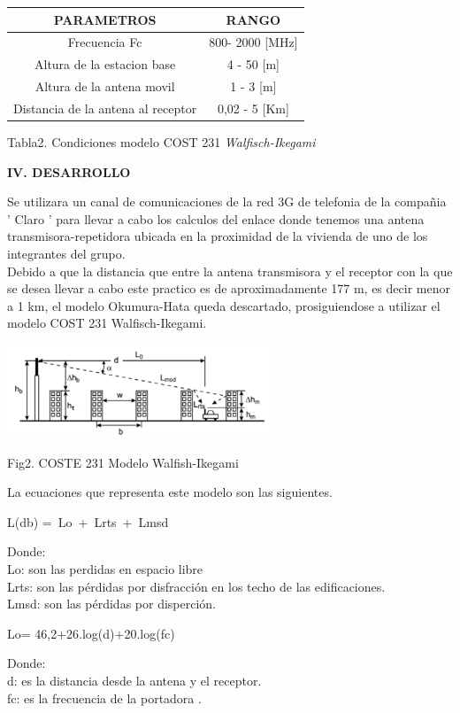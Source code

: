 \documentclass[10pt,a4paper]{article}
\begin{document}
\begin{multicols}{2}
\begin{center}
\begin{tabular}{|c|c|}\hline
PARAMETROS & RANGO \\ \hline
Frecuencia Fc &  800- 2000 [MHz] \\ \hline
Altura de la estacion base & 4 - 50 [m] \\ \hline 
Altura de la antena movil   &  1 - 3 [m] \\ \hline
Distancia de la antena al receptor & 0,02 -  5 [Km] \\ \hline
\end{tabular}
\end{center}
\begin{center}
Tabla2. Condiciones modelo COST 231 \textit{Walfisch-Ikegami}
\end{center}



\begin{center}
\textbf{IV. DESARROLLO}
\end{center}
Se utilizara un canal de comunicaciones de la red 3G de telefonia de la compañia ' Claro ' para llevar a cabo los calculos del enlace donde tenemos una antena transmisora-repetidora ubicada en la proximidad de la vivienda de uno de los integrantes del grupo.\\
Debido a que la distancia que entre la antena transmisora
y el receptor con la que se desea llevar a cabo este practico es de aproximadamente 177 m, es decir menor a 1 km, el modelo Okumura-Hata queda descartado, prosiguiendose a utilizar el modelo  COST 231 Walfisch-Ikegami.\\
\begin{center}
\includegraphics[width=8cm]{image/GRAFICAAA.PNG} 
\end{center}
\begin{center}
Fig2. COSTE 231 Modelo Walfish-Ikegami
\end{center}
La ecuaciones que representa este modelo son las siguientes.\\
\begin{center}
 L(db) =\ Lo\ +\ Lrts\ +\ Lmsd 
\end{center}
Donde:\\
Lo: son las perdidas en espacio libre\\
Lrts: son las pérdidas por disfracción en los techo de las edificaciones. \\
Lmsd: son las pérdidas por disperción.\\
\begin{center}
 Lo= 46,2+26.log(d)+20.log(fc)
\end{center}
Donde:\\
d: es la distancia desde la antena y el receptor.\\
fc: es la frecuencia de la portadora . \\


\end{multicols}
\end{document}
